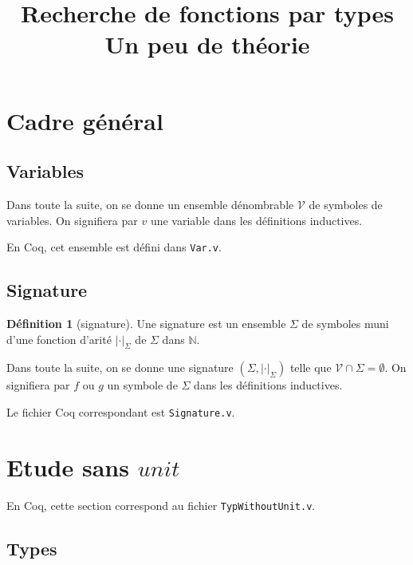\documentclass [a4paper,12pt] {article}
\title {
	Recherche de fonctions par types \\[0.5em]
	\large Un peu de théorie
}
\date {}
\theoremstyle {definition}
\newtheorem {definition} {Définition} [subsection]
\newcommand {\V} {\mathscr V}
\begin{document}
\maketitle


\section {Cadre général}

\subsection {Variables}

Dans toute la suite, on se donne un ensemble dénombrable $\V$ de symboles de variables. On signifiera par $v$ une variable dans les définitions inductives.

En Coq, cet ensemble est défini dans \texttt {Var.v}.

\subsection {Signature}

\begin {definition} [signature]
	Une signature est un ensemble $\Sigma$ de symboles muni d'une fonction d'arité $| \cdot |_\Sigma$ de $\Sigma$ dans $\mathbb N$.
\end {definition}

Dans toute la suite, on se donne une signature $( \Sigma, | \cdot |_\Sigma )$ telle que $\V \cap \Sigma = \emptyset$. On signifiera par $f$ ou $g$ un symbole de $\Sigma$ dans les définitions inductives.

Le fichier Coq correspondant est \texttt {Signature.v}.


\section {Etude sans $unit$}

En Coq, cette section correspond au fichier \texttt {TypWithoutUnit.v}.


\subsection {Types}
\end{document}
